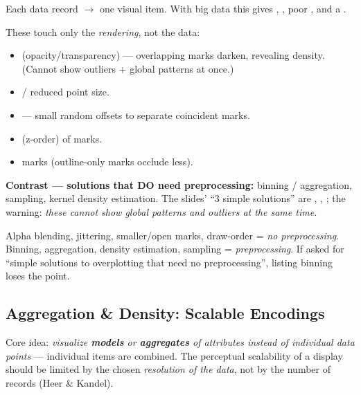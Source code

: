 Each data record $\to$ one visual item. With big data this gives
, , poor , and a
.

\begin{keybox}
These touch only the \emph{rendering}, not the data:
\begin{itemize}
  \item {} (opacity/transparency) --- overlapping marks
        darken, revealing density. (Cannot show outliers + global patterns at
        once.)
  \item {} / reduced point size.
  \item {} --- small random offsets to separate coincident marks.
  \item {} (z-order) of marks.
  \item {} marks (outline-only marks occlude less).
\end{itemize}
\textbf{Contrast --- solutions that DO need preprocessing:} binning /
aggregation, sampling, kernel density estimation. The slides' ``3 simple
solutions'' are , , ; the warning: \emph{these cannot show global patterns and outliers at
the same time.}
\end{keybox}

\begin{pitfall}
Alpha blending, jittering, smaller/open marks, draw-order = \emph{no
preprocessing}. Binning, aggregation, density estimation, sampling =
\emph{preprocessing}. If asked for ``simple solutions to overplotting that need
no preprocessing'', listing binning loses the point.
\end{pitfall}

\subsection{Aggregation \& Density: Scalable Encodings}

Core idea: \emph{visualize \textbf{models} or \textbf{aggregates} of attributes
instead of individual data points} --- individual items are combined. The
perceptual scalability of a display should be limited by the chosen
\emph{resolution of the data}, not by the number of records (Heer \& Kandel).

